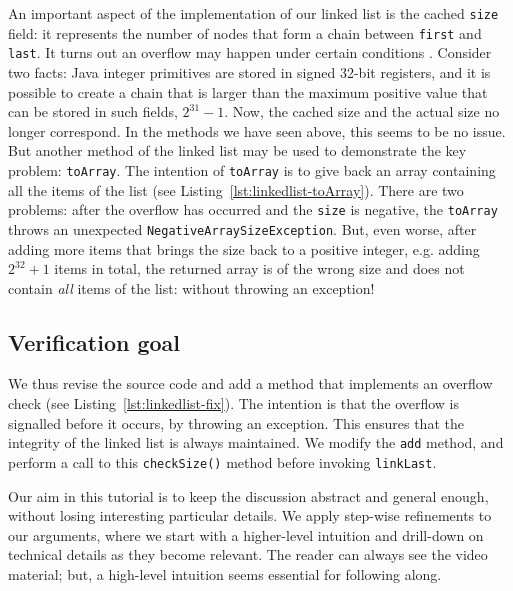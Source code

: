 \documentclass[runningheads]{llncs}
\begin{document}
An important aspect of the implementation of our linked list is the cached \texttt{size} field: it represents the number of nodes that form a chain between \texttt{first} and \texttt{last}. It turns out an overflow may happen under certain conditions . Consider two facts: Java integer primitives are stored in signed 32-bit registers, and it is possible to create a chain that is larger than the maximum positive value that can be stored in such fields, $2^{31}-1$. Now, the cached size and the actual size no longer correspond. In the methods we have seen above, this seems to be no issue. But another method of the linked list may be used to demonstrate the key problem: \texttt{toArray}. The intention of \texttt{toArray} is to give back an array containing all the items of the list (see Listing~\ref{lst:linkedlist-toArray}). There are two problems: after the overflow has occurred and the \texttt{size} is negative, the \texttt{toArray} throws an unexpected \texttt{NegativeArraySizeException}. But, even worse, after adding more items that brings the size back to a positive integer, e.g. adding $2^{32}+1$ items in total, the returned array is of the wrong size and does not contain \emph{all} items of the list: without throwing an exception!



\subsection{Verification goal}

We thus revise the source code and add a method that implements an overflow check (see Listing~\ref{lst:linkedlist-fix}). The intention is that the overflow is signalled before it occurs, by throwing an exception. This ensures that the integrity of the linked list is always maintained. We modify the \texttt{add} method, and perform a call to this \texttt{checkSize()} method before invoking \texttt{linkLast}.



Our aim in this tutorial is to keep the discussion abstract and general enough, without losing interesting particular details. We apply step-wise refinements to our arguments, where we start with a higher-level intuition and drill-down on technical details as they become relevant. The reader can always see the video material; but, a high-level intuition seems essential for following along.
\end{document}
